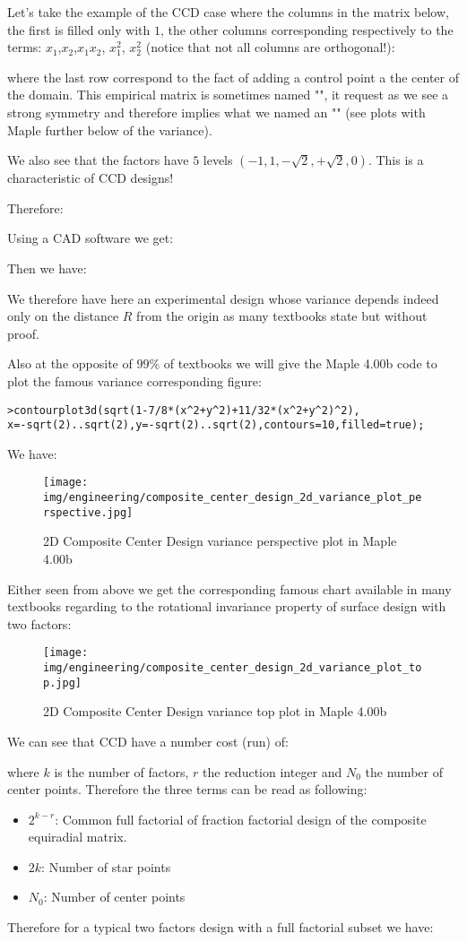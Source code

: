 	Let's take the example of the CCD case where the columns in the matrix below, the first is filled only with $1$, the other columns corresponding respectively to the terms: $x_1$,$x_2$,$x_1x_2$, $x_1^2$, $x_2^2$ (notice that not all columns are orthogonal!):
	
	where the last row correspond to the fact of adding a control point a the center of the domain. This empirical matrix is sometimes named "", it request as we see a strong symmetry and therefore implies what we named an "" (see plots with Maple further below of the variance).
	
	We also see that the factors have $5$ levels $(-1,1,-\sqrt{2},+\sqrt{2},0)$. This is a characteristic of CCD designs!
	
	Therefore:
	
	Using a CAD software we get:
	
	Then we have:
	
	We therefore have here an experimental design whose variance depends indeed only on the distance $R$ from the origin as many textbooks state but without proof.

	Also at the opposite of $99\%$ of textbooks we will give the Maple 4.00b code to plot the famous variance corresponding figure:

	\texttt{>contourplot3d(sqrt(1-7/8*(x\string^2+y\string^2)+11/32*(x\string^2+y\string^2)\string^2),\\x=-sqrt(2)..sqrt(2),y=-sqrt(2)..sqrt(2),contours=10,filled=true);}
	
	We have:
	\begin{figure}[H]
		\centering
		\texttt{[image: img/engineering/composite\_center\_design\_2d\_variance\_plot\_perspective.jpg]}	
		\caption{2D Composite Center Design variance perspective plot in Maple 4.00b}
	\end{figure}
	Either seen from above we get the corresponding famous chart available in many textbooks regarding to the rotational invariance property of surface design with two factors:
	\begin{figure}[H]
		\centering
		\texttt{[image: img/engineering/composite\_center\_design\_2d\_variance\_plot\_top.jpg]}	
		\caption{2D Composite Center Design variance top plot in Maple 4.00b}
	\end{figure}
	We can see that CCD have a number cost (run) of:
	
	where $k$ is the number of factors, $r$ the reduction integer and $N_0$ the number of center points. Therefore the three terms can be read as following:
	\begin{itemize}
		\item $2^{k-r}$: Common full factorial of fraction factorial design of the  composite equiradial matrix.

		\item $2k$: Number of star points

		\item $N_0$: Number of center points
	\end{itemize}
	Therefore for a typical two factors design with a full factorial subset we have:
	
